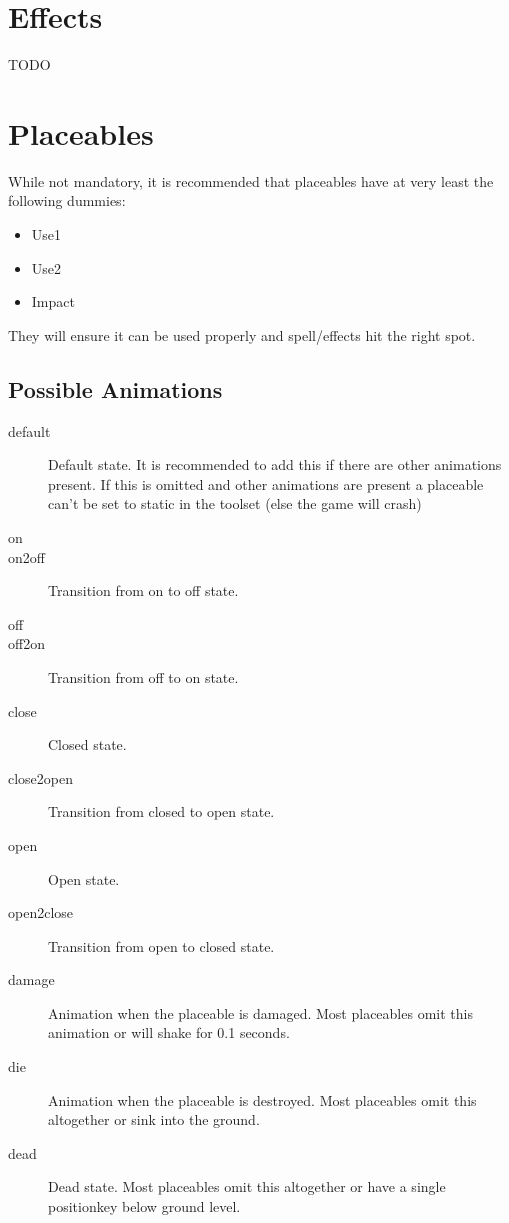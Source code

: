 \section{Effects}
TODO


\section{Placeables}
While not mandatory, it is recommended that placeables have at very least the
following dummies:
\begin{itemize}
\item Use1
\item Use2
\item Impact
\end{itemize}
They will ensure it can be used properly and spell/effects hit the right spot.

\subsection*{Possible Animations}
\begin{description}
    \item[default] Default state. It is recommended to add this if there are other animations present. If this is omitted and other animations are present a placeable can't be set to static in the toolset (else the game will crash)
    \item[on]
    \item[on2off] Transition from on to off state.
    \item[off]
    \item[off2on] Transition from off to on state.
    \item[close] Closed state.
    \item[close2open] Transition from closed to open state.
    \item[open] Open state.
    \item[open2close] Transition from open to closed state.
    \item[damage] Animation when the placeable is damaged. Most placeables omit this animation or will shake for 0.1 seconds.
    \item[die] Animation when the placeable is destroyed. Most placeables omit this altogether or sink into the ground.
    \item[dead] Dead state. Most placeables omit this altogether or have a single positionkey below ground level.
\end{description}

